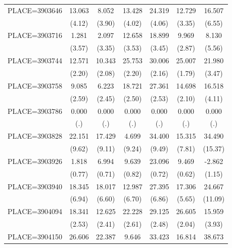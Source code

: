 {\begin{tabular}{l*{6}{c}}
PLACE=3903646       &      13.063&       8.052&      13.428&      24.319&      12.729&      16.507\\
                    &      (4.12)&      (3.90)&      (4.02)&      (4.06)&      (3.35)&      (6.55)\\
PLACE=3903716       &       1.281&       2.097&      12.658&      18.899&       9.969&       8.130\\
                    &      (3.57)&      (3.35)&      (3.53)&      (3.45)&      (2.87)&      (5.56)\\
PLACE=3903744       &      12.571&      10.343&      25.753&      30.006&      25.007&      21.980\\
                    &      (2.20)&      (2.08)&      (2.20)&      (2.16)&      (1.79)&      (3.47)\\
PLACE=3903758       &       9.085&       6.223&      18.721&      27.361&      14.698&      16.518\\
                    &      (2.59)&      (2.45)&      (2.50)&      (2.53)&      (2.10)&      (4.11)\\
PLACE=3903786       &       0.000&       0.000&       0.000&       0.000&       0.000&       0.000\\
                    &         (.)&         (.)&         (.)&         (.)&         (.)&         (.)\\
PLACE=3903828       &      22.151&      17.429&       4.699&      34.400&      15.315&      34.490\\
                    &      (9.62)&      (9.11)&      (9.24)&      (9.49)&      (7.81)&     (15.37)\\
PLACE=3903926       &       1.818&       6.994&       9.639&      23.096&       9.469&      -2.862\\
                    &      (0.77)&      (0.71)&      (0.82)&      (0.72)&      (0.62)&      (1.15)\\
PLACE=3903940       &      18.345&      18.017&      12.987&      27.395&      17.306&      24.667\\
                    &      (6.94)&      (6.60)&      (6.70)&      (6.86)&      (5.65)&     (11.09)\\
PLACE=3904094       &      18.341&      12.625&      22.228&      29.125&      26.605&      15.959\\
                    &      (2.53)&      (2.41)&      (2.61)&      (2.48)&      (2.04)&      (3.93)\\
PLACE=3904150       &      26.606&      22.387&       9.646&      33.423&      16.814&      38.673\\

\end{tabular}}
